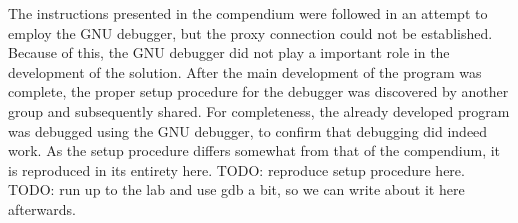 The instructions presented in the compendium were followed in an attempt to employ the GNU debugger, but the proxy connection could not be established.
Because of this, the GNU debugger did not play a important role in the development of the solution.
After the main development of the program was complete, the proper setup procedure for the debugger was discovered by another group and subsequently shared.
For completeness, the already developed program was debugged using the GNU debugger, to confirm that debugging did indeed work.
As the setup procedure differs somewhat from that of the compendium, it is reproduced in its entirety here.
TODO: reproduce setup procedure here.
TODO: run up to the lab and use gdb a bit, so we can write about it here afterwards.
